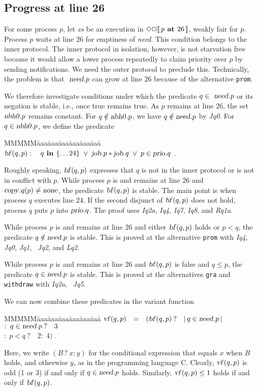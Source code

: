 \documentclass[10pt]{article} \usepackage[english]{babel}
\newenvironment{tab}{\begin{tabbing}
MMMMM\=aaa\=aaa\=aaa\=aaa\=aaa\=aaa\= \kill}{\end{tabbing}}
\def\sem #1{\hbox{$[\![\, #1\, ]\!] $}}
\def\S #1/{\mbox {\textsl{#1}}}
\def\B #1/{\mbox {\textbf{#1}}}
\def\T #1/{\mbox {\texttt{#1}}}
\def\Lor    {\;\lor\;}
\def\IS     {\mbox{$\quad =\quad $}}
\begin{document}
\subsection{Progress at line 26} \label{progress26}

For some process $p$, let \S xs/ be an execution in $\Diamond \Box
\sem {p\B\ at /26}$, weakly fair for $p$.  Process $p$ waits at line
26 for emptiness of \S need/. This condition belongs to the inner
protocol.  The inner protocol in isolation, however, is not starvation
free because it would allow a lower process repeatedly to claim
priority over $p$ by sending notifications.  We need the outer
protocol to preclude this.  Technically, the problem is that $\S
need/.p$ can grow at line 26 because of the alternative \T prom/.

We therefore investigate conditions under which the predicate $q\in\S
need/.p$ or its negation is stable, i.e., once true remains true.  As
$p$ remains at line 26, the set $\S nbh0/.p$ remains constant.  For
$q\notin\S nbh0/.p$, we have $q\notin \S need/.p$ by \S Jq0/.  For
$q\in\S nbh0/.p$, we define the predicate
\begin{tab}
\> $ \S bf/(q, p): \quad q\B\ in /\{\dots 24\} \Lor
 \S job/.p * \S job/.q \Lor p\in\S prio/.q $ .
\end{tab} 
Roughly speaking, $ \S bf/(q, p)$ expresses that $q$ is not in the
inner protocol or is not in conflict with $p$.  While process $p$ is
and remains at line 26 and $\S copy/.q(p)\ne\S none/$, the predicate
$\S bf/(q, p)$ is stable. The main point is when process $q$ executes
line 24.  If the second disjunct of $\S bf/(q,p)$ does not
hold, process $q$ puts $p$ into $\S prio/.q$. The proof uses \S Iq2a/,
\S Iq4/, \S Iq7/, \S Iq8/, and \S Rq1a/.

While process $p$ is and remains at line 26 and either $\S bf/(q,p)$
holds or $p < q$, the predicate $q\notin\S need/.p$ is stable. This is
proved at the alternative \T prom/ with \S Iq4/, \S Jq0/, \S Jq1/, \S
Jq2/, and \S Lq2/.

While process $p$ is and remains at line 26 and $\S bf/(q,p)$ is false
and $q\leq p$, the predicate $q\in\S need/.p$ is stable. This is
proved at the alternatives \T gra/ and \T withdraw/ with \S Iq2a/, \S
Jq5/.

We can now combine these predicates in the variant function
\begin{tab}
  \> $ \S vf/(q, p) \IS (\S bf/(q, p)\: ? \quad |\,q\in\S need/.p\,| $ \\
\>\>\>\>\> $: \; q\in\S need/.p\: ?\quad 3 $\\
\>\>\>\>\> $: \; p < q\: ?\quad 2 :\; 4) $ .
\end{tab}
Here, we write $(B\,?\:x:y)$ for the conditional expression that
equals $x$ when $B$ holds, and otherwise $y$, as in the programming
language C.  Clearly, $\S vf/(q, p)$ is odd (1 or 3) if and only if
$q\in\S need/.p$ holds. Similarly, $\S vf/(q, p) \leq 1$ holds if and
only if $\S bf/(q, p)$.
\end{document}
